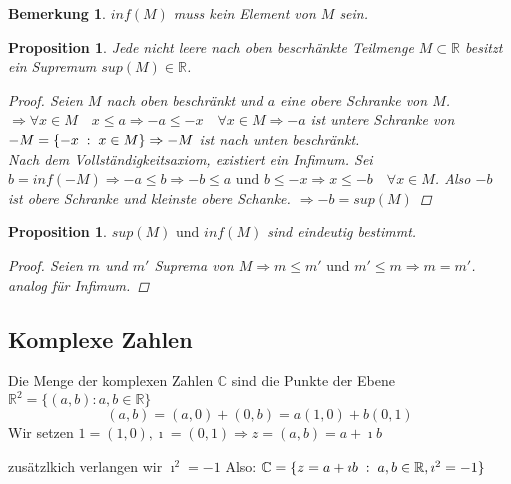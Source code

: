 \documentclass[a4paper,titlepage,oneside]{article}
\def\C{\ensuremath{\mathbb{C}} }
\def\R{\ensuremath{\mathbb{R}} }
\def\im{\ensuremath{\imath} }
\newcommand{\fa}{\ensuremath{\forall}}
\def\sp{\hspace{0,1cm}}
\newcommand{\menge}[2]{\ensuremath{\{#1\sp : \sp #2\}}}
\theoremstyle{thmstyle}
\newtheorem{prop}[satz]{Proposition}
\newtheorem{bem}[satz]{Bemerkung}
\begin{document}
\begin{bem}
\(inf(M)\) muss kein Element von \(M\) sein.
\end{bem}

\begin{prop}
Jede nicht leere nach oben bescrhänkte Teilmenge \(M \subset \R\) besitzt ein Supremum \(sup(M) \in \R\).
\begin{proof}
Seien \(M\) nach oben beschränkt und \(a\) eine obere Schranke von \(M\). 
\(\Rightarrow \fa x \in M  \quad x \le a \Rightarrow -a \le -x \quad \fa x \in M \Rightarrow -a\) ist untere Schranke von \(-M = \menge{-x}{x \in M} \Rightarrow -M\) ist nach unten beschränkt.\\
Nach dem Vollständigkeitsaxiom, existiert ein Infimum. Sei \(b= inf(-M) \Rightarrow -a \le b \Rightarrow -b \le a \text{ und } b \le -x \Rightarrow x \le -b \quad \forall x \in M\). Also \(-b\) ist obere Schranke und kleinste obere Schanke. \(\Rightarrow -b = sup(M)\)
\end{proof}
\end{prop}

\begin{prop}
\(sup(M) \text{ und } inf(M)\) sind eindeutig bestimmt.
\begin{proof}
Seien \(m\) und \(m'\) Suprema von \(M \Rightarrow m \le m' \text{ und } m' \le m \Rightarrow m = m'\).\\
analog für Infimum.
\end{proof}
\end{prop}

\newpage
\subsection{Komplexe Zahlen}
Die Menge der komplexen Zahlen \C sind die Punkte der Ebene \(\R^2 = \{(a,b) : a,b \in \R\}\)
\[(a,b) = (a, 0) + (0, b) = a (1,0) + b (0, 1)\]
Wir setzen \(1 = (1,0), \im = (0,1) \Rightarrow z = (a, b) = a + \im b\)\\
\begin{center}
\end{center}
zusätzlkich verlangen wir \(\im^2 = -1\) Also: \(\C = \menge{z = a + \im b }{ a, b \in \R, \im^2 = -1 }\)
\end{document}
